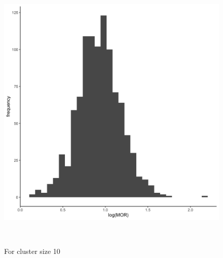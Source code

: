 \documentclass[
  letterpaper,
  DIV=11,
  numbers=noendperiod,
  titlepage]{scrartcl}
\begin{document}
\begin{figure}
\begin{minipage}[t]{0.50\linewidth}
{{\includegraphics{../../plots/two-lvl-ran-slope/low-prev/hist_50_10_two_lvl_slp_low_prev.png}

}

\caption{For cluster size 10}

}

\end{minipage}%
\newline
\begin{minipage}[t]{\linewidth}

{\centering 

~

}

\end{minipage}%
\newline
\begin{minipage}[t]{0.50\linewidth}

{\centering 

\raisebox{-\height}{

}}
\end{minipage}
\end{figure}
\end{document}

